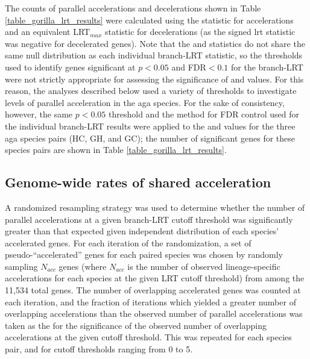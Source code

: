 The counts of parallel accelerations and decelerations shown in Table
\ref{table_gorilla_lrt_results} were calculated using the \lrtmin
statistic for accelerations and an equivalent LRT$_{max}$ statistic
for decelerations (as the signed \ac{lrt} statistic was negative for
decelerated genes). Note that the \lrtmin and \lrtmax statistics do
not share the same null distribution as each individual branch-LRT
statistic, so the \chisq thresholds used to identify genes significant
at $p<0.05$ and FDR$<0.1$ for the branch-LRT were not strictly
appropriate for assessing the significance of \lrtmin and \lrtmax
values. For this reason, the analyses described below used a variety
of \lrtmin thresholds to investigate levels of parallel acceleration
in the \ac{aga} species. For the sake of consistency, however, the
same $p<0.05$ \chisq threshold and the \citet{Benjamini1995} method
for FDR control used for the individual branch-LRT results were
applied to the \lrtmin and \lrtmax values for the three \ac{aga}
species pairs (HC, GH, and GC); the number of significant genes for
these species pairs are shown in Table
\ref{table_gorilla_lrt_results}.

\subsection{Genome-wide rates of shared acceleration}

A randomized resampling strategy was used to determine whether the
number of parallel accelerations at a given branch-LRT cutoff
threshold was significantly greater than that expected given
independent distribution of each species' accelerated genes. For each
iteration of the randomization, a set of pseudo-``accelerated'' genes
for each paired species was chosen by randomly sampling $N_{acc}$
genes (where $N_{acc}$ is the number of observed lineage-specific
accelerations for each species at the given LRT cutoff threshold) from
among the 11,534 total genes. The number of overlapping accelerated
genes was counted at each iteration, and the fraction of iterations
which yielded a greater number of overlapping accelerations than the
observed number of parallel accelerations was taken as the \pv for the
significance of the observed number of overlapping accelerations at
the given cutoff threshold. This was repeated for each species pair,
and for cutoff thresholds ranging from 0 to 5.

